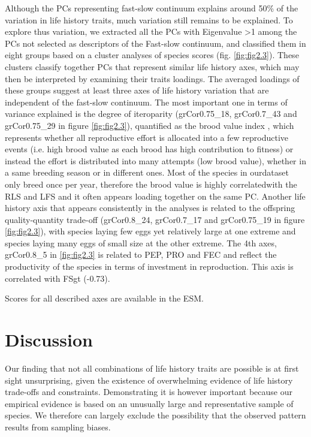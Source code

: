 Although the PCs representing fast-slow continuum explains around 50\% of the 
variation in life history traits, much variation still remains to be explained.
To explore thus variation, we extracted all the PCs with Eigenvalue
\textgreater{1} among the
PCs not selected as descriptors of the Fast-slow continuum, and classified them 
in eight groups based on a cluster analyses of species scores (fig.
\ref{fig:fig2.3}). These clusters classify together PCs that represent similar
life history axes, which may then be interpreted by examining their traits
loadings. The averaged loadings of these groups suggest at least three axes of
life history variation that are independent of the fast-slow continuum.
The most important one in terms of variance explained is the degree of
iteroparity (grCor0.75\_18, grCor0.7\_43 and grCor0.75\_29 in figure
\ref{fig:fig2.3}), quantified as the brood value index \citep{Bokony2009}⁠,
which represents whether all reproductive effort is allocated into a few
reproductive events (i.e. high brood value as each brood has high contribution
to fitness) or instead the effort is distributed into many attempts (low brood
value), whether in a same breeding season or in different ones. Most of the
species in ourdataset only breed once per year, therefore the brood value is
highly correlatedwith the RLS and LFS and it often appears loading together on
the same PC.
Another life history axis that appears consistently in the analyses is related 
to the offspring quality-quantity trade-off (grCor0.8\_24, grCor0.7\_17 and 
grCor0.75\_19 in figure \ref{fig:fig2.3}), with species laying few eggs yet
relatively large at one extreme and species laying many eggs of small size at
the other extreme. The 4th axes, grCor0.8\_5 in \ref{fig:fig2.3} is related to
PEP, PRO and FEC and reflect the productivity of the species in terms of
investment in reproduction. This axis is correlated with FSgt (-0.73).

Scores for all described axes are available in the ESM. %


\section{Discussion}

Our finding that not all combinations of life history traits are possible is at 
first sight unsurprising, given the existence of overwhelming evidence of life 
history trade-offs and constraints. Demonstrating it is however important 
because our empirical evidence is based on an unusually large and representative 
sample of species. We therefore can largely exclude the possibility that the 
observed pattern results from sampling biases.

